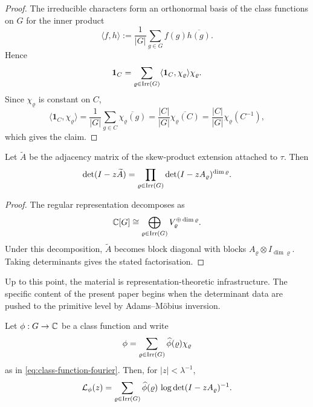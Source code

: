 \begin{proof}
  The irreducible characters form an orthonormal basis of the class
  functions on \(G\) for the inner product
  \[
    \langle f,h\rangle
    :=\frac{1}{|G|}\sum_{g\in G}f(g)\overline{h(g)}.
  \]
  Hence
  \[
    \mathbf 1_C
    =\sum_{\varrho\in\operatorname{Irr}(G)}
      \langle \mathbf 1_C,\chi_\varrho\rangle \chi_\varrho.
  \]
  Since \(\chi_\varrho\) is constant on \(C\),
  \[
    \langle \mathbf 1_C,\chi_\varrho\rangle
    =\frac{1}{|G|}\sum_{g\in C}\overline{\chi_\varrho(g)}
    =\frac{|C|}{|G|}\overline{\chi_\varrho(C)}
    =\frac{|C|}{|G|}\chi_\varrho(C^{-1}),
  \]
  which gives the claim.
\end{proof}

\begin{proposition}
  \label{prop:kernel-peter-weyl-block-diagonalisation}
  Let \(\widetilde A\) be the adjacency matrix of the skew-product
  extension attached to \(\tau\). Then
  \[
    \det(I-z\widetilde A)
    =
    \prod_{\varrho\in\operatorname{Irr}(G)}
      \det(I-zA_\varrho)^{\dim\varrho}.
  \]
\end{proposition}

\begin{proof}
  The regular representation decomposes as
  \[
    \mathbb{C}[G]
    \cong
    \bigoplus_{\varrho\in\operatorname{Irr}(G)}
      V_\varrho^{\oplus \dim\varrho}.
  \]
  Under this decomposition, \(\widetilde A\) becomes block diagonal with
  blocks \(A_\varrho\otimes I_{\dim\varrho}\). Taking determinants gives
  the stated factorisation.
\end{proof}

\noindent
Up to this point, the material is representation-theoretic
infrastructure. The specific content of the present paper begins when
the determinant data are pushed to the primitive level by
Adams--M\"obius inversion.

\begin{theorem}
  \label{thm:class-function-linearisation}
  Let \(\phi:G\to\mathbb{C}\) be a class function and write
  \[
    \phi=\sum_{\varrho\in\operatorname{Irr}(G)}\widehat\phi(\varrho)\chi_\varrho
  \]
  as in \eqref{eq:class-function-fourier}. Then, for \(|z|<\lambda^{-1}\),
  \begin{equation}\label{eq:class-logarithm-determinant-linearisation}
    \mathcal L_\phi(z)
    =
    \sum_{\varrho\in\operatorname{Irr}(G)}
      \widehat\phi(\varrho)\,
      \log\det(I-zA_\varrho)^{-1}.
  \end{equation}
\end{theorem}

